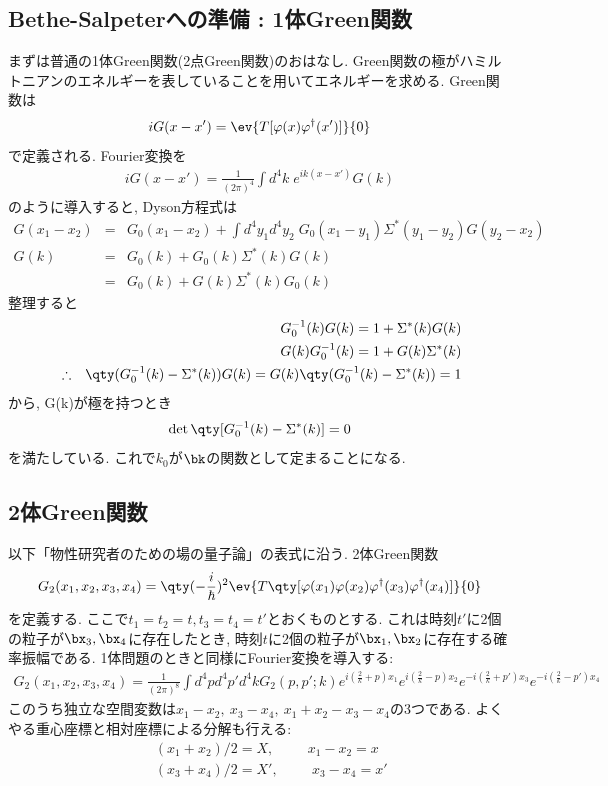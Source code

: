 \documentclass[10.5pt,a4paper]{jreport}
\begin{document}
\subsection{Bethe-Salpeterへの準備 : 1体Green関数}
まずは普通の1体Green関数(2点Green関数)のおはなし. Green関数の極がハミルトニアンのエネルギーを表していることを用いてエネルギーを求める. Green関数は
\begin{eqnarray}
  iG(x-x') = \ev{T[\varphi(x)\varphi^\dagger(x')]}{0}
\end{eqnarray}
で定義される. Fourier変換を
\begin{eqnarray}
  iG(x-x') = \frac{1}{(2\pi)^4}\int d^4k\;e^{ik(x-x')}G(k)
\end{eqnarray}
のように導入すると, Dyson方程式は
\begin{eqnarray}
  G(x_1-x_2) &=& G_0(x_1-x_2) + \int d^4y_1d^4y_2\;G_0(x_1-y_1)\Sigma^*(y_1-y_2)G(y_2-x_2)\\
  G(k) &=& G_0(k) + G_0(k)\Sigma^*(k)G(k)\\
  &=& G_0(k) + G(k)\Sigma^*(k)G_0(k)
\end{eqnarray}
整理すると
\begin{eqnarray}
  &&G^{-1}_0(k)G(k) = 1 + \Sigma^*(k)G(k)\\
  &&G(k)G^{-1}_0(k) = 1 + G(k)\Sigma^*(k)\\
  &\therefore& \qty(G^{-1}_0(k) - \Sigma^*(k))G(k) = G(k)\qty(G^{-1}_0(k) - \Sigma^*(k)) = 1
\end{eqnarray}
から, G(k)が極を持つとき
\begin{eqnarray}
  \det\qty[G^{-1}_0(k) - \Sigma^*(k)] = 0
\end{eqnarray}
を満たしている. これで$k_0$が$\bk$の関数として定まることになる.
\subsection{2体Green関数}
以下「物性研究者のための場の量子論」の表式に沿う. 2体Green関数
\begin{eqnarray}
  G_2(x_1, x_2, x_3, x_4) = \qty(-\frac{i}{\hbar})^2\ev{T\qty[\varphi(x_1)\varphi(x_2)\varphi^\dagger(x_3)\varphi^\dagger(x_4)]}{0}
\end{eqnarray}
を定義する. ここで$t_1 = t_2 = t, t_3 = t_4 = t'$とおくものとする. これは時刻$t'$に2個の粒子が$\bx_3, \bx_4$に存在したとき, 時刻$t$に2個の粒子が$\bx_1, \bx_2$に存在する確率振幅である. 1体問題のときと同様にFourier変換を導入する:
\begin{eqnarray}
  G_2(x_1, x_2, x_3, x_4) = \frac{1}{(2\pi)^8}\int d^4pd^4p'd^4kG_2(p, p';k)e^{i(\frac{2}{k}+p)x_1}e^{i(\frac{2}{k}-p)x_2}e^{-i(\frac{2}{k}+p')x_3}e^{-i(\frac{2}{k}-p')x_4}
\end{eqnarray}
このうち独立な空間変数は$x_1-x_2,\ x_3-x_4,\ x_1+x_2-x_3-x_4$の3つである. よくやる重心座標と相対座標による分解も行える:
\begin{eqnarray}
  &&(x_1+x_2)/2 = X,\hspace{1cm} x_1-x_2 = x\\
  &&(x_3+x_4)/2 = X',\hspace{1cm} x_3-x_4 = x'
\end{eqnarray}
\end{document}
